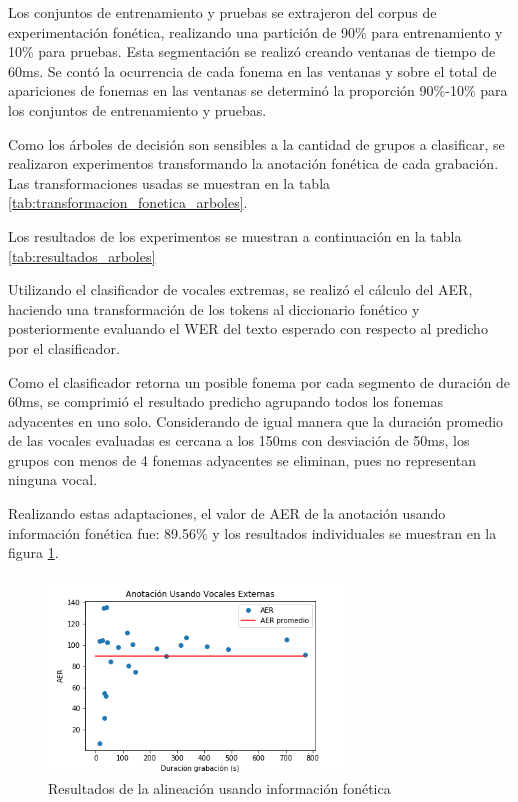 Los conjuntos de entrenamiento y pruebas se extrajeron del corpus de experimentación fonética, realizando una partición de 90\% para entrenamiento y 10\% para pruebas. Esta segmentación se realizó creando ventanas de tiempo de 60ms. Se contó la ocurrencia de cada fonema en las ventanas y sobre el total de apariciones de fonemas en las ventanas se determinó la proporción 90\%-10\% para los conjuntos de entrenamiento y pruebas.

Como los árboles de decisión son sensibles a la cantidad de grupos a clasificar, se realizaron experimentos transformando la anotación fonética de cada grabación. Las transformaciones usadas se muestran en la tabla \ref{tab:transformacion_fonetica_arboles}.



Los resultados de los experimentos se muestran a continuación en la tabla \ref{tab:resultados_arboles}



Utilizando el clasificador de vocales extremas, se realizó el cálculo del AER, haciendo una transformación de los tokens al diccionario fonético y posteriormente evaluando el WER del texto esperado con respecto al predicho por el clasificador.

Como el clasificador retorna un posible fonema por cada segmento de duración de 60ms, se comprimió el resultado predicho agrupando todos los fonemas adyacentes en uno solo. Considerando de igual manera que la duración promedio de las vocales evaluadas es cercana a los 150ms con desviación de 50ms, los grupos con menos de 4 fonemas adyacentes se eliminan, pues no representan ninguna vocal.

Realizando estas adaptaciones, el valor de AER de la anotación usando información fonética fue: 89.56\% y los resultados individuales se muestran en la figura \ref{img:aer_vocales_externas}.

\begin{figure}[H]
\caption{Resultados de la alineación usando información fonética}
\label{img:aer_vocales_externas}
\begin{center}
\includegraphics[width=0.7\textwidth]{imagenes/04_04_aer_vocales_externas.png}
\end{center}
\end{figure}

